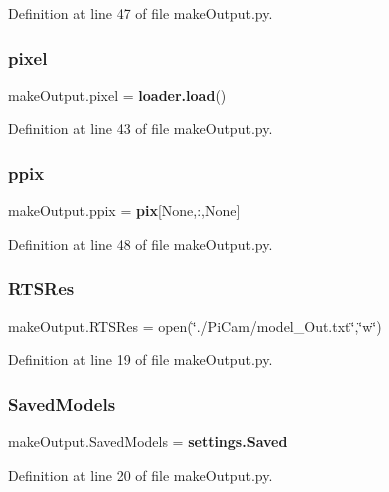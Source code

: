 Definition at line 47 of file make\+Output.\+py.

\mbox{\label{namespacemake_output_aebe26dd7e84251b2f8c67278ab4ec495}} 
\subsubsection{pixel}
{\footnotesize\ttfamily make\+Output.\+pixel = \textbf{ loader.\+load}()}



Definition at line 43 of file make\+Output.\+py.

\mbox{\label{namespacemake_output_a05652e1d36f6eefc17d2c7df2236c90b}} 
\subsubsection{ppix}
{\footnotesize\ttfamily make\+Output.\+ppix = \textbf{ pix}[None,\+:,None]}



Definition at line 48 of file make\+Output.\+py.

\mbox{\label{namespacemake_output_a32f8841182ee63e40481c5ceafe3baa1}} 
\subsubsection{R\+T\+S\+Res}
{\footnotesize\ttfamily make\+Output.\+R\+T\+S\+Res = open(\char`\"{}./Pi\+Cam/model\+\_\+\+Out.\+txt\char`\"{},\char`\"{}w\char`\"{})}



Definition at line 19 of file make\+Output.\+py.

\mbox{\label{namespacemake_output_a5225251e961f2a90cfb650dd56ab3ba0}} 
\subsubsection{Saved\+Models}
{\footnotesize\ttfamily make\+Output.\+Saved\+Models = \textbf{ settings.\+Saved}}



Definition at line 20 of file make\+Output.\+py.

